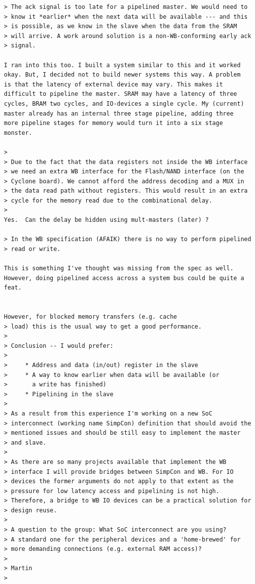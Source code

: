 \documentclass[a4paper,12pt]{scrartcl}
\begin{document}
\begin{verbatim}
> The ack signal is too late for a pipelined master. We would need to
> know it *earlier* when the next data will be available --- and this
> is possible, as we know in the slave when the data from the SRAM
> will arrive. A work around solution is a non-WB-conforming early ack
> signal.

I ran into this too. I built a system similar to this and it worked
okay. But, I decided not to build newer systems this way. A problem
is that the latency of external device may vary. This makes it
difficult to pipeline the master. SRAM may have a latency of three
cycles, BRAM two cycles, and IO-devices a single cycle. My (current)
master already has an internal three stage pipeline, adding three
more pipeline stages for memory would turn it into a six stage
monster.

>
> Due to the fact that the data registers not inside the WB interface
> we need an extra WB interface for the Flash/NAND interface (on the
> Cyclone board). We cannot afford the address decoding and a MUX in
> the data read path without registers. This would result in an extra
> cycle for the memory read due to the combinational delay.
>
Yes.  Can the delay be hidden using mult-masters (later) ?

> In the WB specification (AFAIK) there is no way to perform pipelined
> read or write.

This is something I've thought was missing from the spec as well.
However, doing pipelined access across a system bus could be quite a
feat.


However, for blocked memory transfers (e.g. cache
> load) this is the usual way to get a good performance.
>
> Conclusion -- I would prefer:
>
>     * Address and data (in/out) register in the slave
>     * A way to know earlier when data will be available (or
>       a write has finished)
>     * Pipelining in the slave
>
> As a result from this experience I'm working on a new SoC
> interconnect (working name SimpCon) definition that should avoid the
> mentioned issues and should be still easy to implement the master
> and slave.
>
> As there are so many projects available that implement the WB
> interface I will provide bridges between SimpCon and WB. For IO
> devices the former arguments do not apply to that extent as the
> pressure for low latency access and pipelining is not high.
> Therefore, a bridge to WB IO devices can be a practical solution for
> design reuse.
>
> A question to the group: What SoC interconnect are you using?
> A standard one for the peripheral devices and a 'home-brewed' for
> more demanding connections (e.g. external RAM access)?
>
> Martin
>


\end{verbatim}
\end{document}
